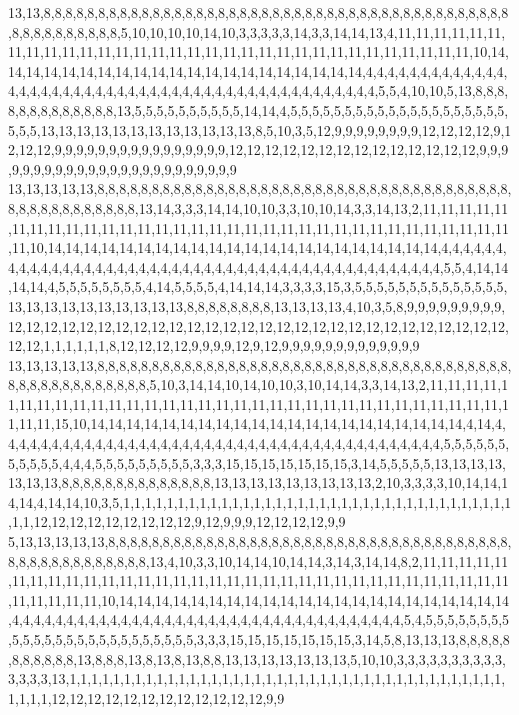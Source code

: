 13,13,8,8,8,8,8,8,8,8,8,8,8,8,8,8,8,8,8,8,8,8,8,8,8,8,8,8,8,8,8,8,8,8,8,8,8,8,8,8,8,8,8,8,8,8,8,8,8,8,8,8,8,8,8,5,10,10,10,10,14,10,3,3,3,3,3,14,3,3,14,14,13,4,11,11,11,11,11,11,11,11,11,11,11,11,11,11,11,11,11,11,11,11,11,11,11,11,11,11,11,11,11,11,11,11,10,14,14,14,14,14,14,14,14,14,14,14,14,14,14,14,14,14,14,14,14,14,4,4,4,4,4,4,4,4,4,4,4,4,4,4,4,4,4,4,4,4,4,4,4,4,4,4,4,4,4,4,4,4,4,4,4,4,4,4,4,4,4,4,4,4,4,4,4,5,5,4,10,10,5,13,8,8,8,8,8,8,8,8,8,8,8,8,8,13,5,5,5,5,5,5,5,5,5,5,14,14,4,5,5,5,5,5,5,5,5,5,5,5,5,5,5,5,5,5,5,5,5,5,5,5,13,13,13,13,13,13,13,13,13,13,13,13,8,5,10,3,5,12,9,9,9,9,9,9,9,9,12,12,12,12,9,12,12,12,9,9,9,9,9,9,9,9,9,9,9,9,9,9,9,9,12,12,12,12,12,12,12,12,12,12,12,12,12,12,9,9,9,9,9,9,9,9,9,9,9,9,9,9,9,9,9,9,9,9,9,9,9,9
13,13,13,13,13,8,8,8,8,8,8,8,8,8,8,8,8,8,8,8,8,8,8,8,8,8,8,8,8,8,8,8,8,8,8,8,8,8,8,8,8,8,8,8,8,8,8,8,8,8,8,8,8,8,8,13,14,3,3,3,14,14,10,10,3,3,10,10,14,3,3,14,13,2,11,11,11,11,11,11,11,11,11,11,11,11,11,11,11,11,11,11,11,11,11,11,11,11,11,11,11,11,11,11,11,11,11,11,10,14,14,14,14,14,14,14,14,14,14,14,14,14,14,14,14,14,14,14,14,14,14,4,4,4,4,4,4,4,4,4,4,4,4,4,4,4,4,4,4,4,4,4,4,4,4,4,4,4,4,4,4,4,4,4,4,4,4,4,4,4,4,4,4,4,4,4,4,5,5,4,14,14,14,14,4,5,5,5,5,5,5,5,5,4,14,5,5,5,5,4,14,14,14,3,3,3,3,15,3,5,5,5,5,5,5,5,5,5,5,5,5,5,5,13,13,13,13,13,13,13,13,13,13,8,8,8,8,8,8,8,8,13,13,13,13,4,10,3,5,8,9,9,9,9,9,9,9,9,9,12,12,12,12,12,12,12,12,12,12,12,12,12,12,12,12,12,12,12,12,12,12,12,12,12,12,12,12,12,12,1,1,1,1,1,1,8,12,12,12,12,9,9,9,9,12,9,12,9,9,9,9,9,9,9,9,9,9,9,9,9
13,13,13,13,13,8,8,8,8,8,8,8,8,8,8,8,8,8,8,8,8,8,8,8,8,8,8,8,8,8,8,8,8,8,8,8,8,8,8,8,8,8,8,8,8,8,8,8,8,8,8,8,8,8,8,8,5,10,3,14,14,10,14,10,10,3,10,14,14,3,3,14,13,2,11,11,11,11,11,11,11,11,11,11,11,11,11,11,11,11,11,11,11,11,11,11,11,11,11,11,11,11,11,11,11,11,11,11,11,15,10,14,14,14,14,14,14,14,14,14,14,14,14,14,14,14,14,14,14,14,14,14,4,14,4,4,4,4,4,4,4,4,4,4,4,4,4,4,4,4,4,4,4,4,4,4,4,4,4,4,4,4,4,4,4,4,4,4,4,4,4,4,4,4,4,5,5,5,5,5,5,5,5,5,5,5,4,4,4,5,5,5,5,5,5,5,5,5,3,3,3,15,15,15,15,15,15,15,3,14,5,5,5,5,5,13,13,13,13,13,13,13,8,8,8,8,8,8,8,8,8,8,8,8,8,8,13,13,13,13,13,13,13,13,13,2,10,3,3,3,3,10,14,14,14,14,4,14,14,10,3,5,1,1,1,1,1,1,1,1,1,1,1,1,1,1,1,1,1,1,1,1,1,1,1,1,1,1,1,1,1,1,1,1,1,1,1,1,1,1,12,12,12,12,12,12,12,12,12,9,12,9,9,9,12,12,12,12,9,9
5,13,13,13,13,13,8,8,8,8,8,8,8,8,8,8,8,8,8,8,8,8,8,8,8,8,8,8,8,8,8,8,8,8,8,8,8,8,8,8,8,8,8,8,8,8,8,8,8,8,8,8,8,8,8,8,13,4,10,3,3,10,14,14,10,14,14,3,14,3,14,14,8,2,11,11,11,11,11,11,11,11,11,11,11,11,11,11,11,11,11,11,11,11,11,11,11,11,11,11,11,11,11,11,11,11,11,11,11,11,11,11,10,14,14,14,14,14,14,14,14,14,14,14,14,14,14,14,14,14,14,14,14,14,14,4,4,4,4,4,4,4,4,4,4,4,4,4,4,4,4,4,4,4,4,4,4,4,4,4,4,4,4,4,4,4,4,4,4,4,4,5,4,5,5,5,5,5,5,5,5,5,5,5,5,5,5,5,5,5,5,5,5,5,5,5,5,5,3,3,3,15,15,15,15,15,15,15,3,14,5,8,13,13,13,8,8,8,8,8,8,8,8,8,8,8,13,8,8,8,13,8,13,8,13,8,8,13,13,13,13,13,13,13,5,10,10,3,3,3,3,3,3,3,3,3,3,3,3,3,3,13,1,1,1,1,1,1,1,1,1,1,1,1,1,1,1,1,1,1,1,1,1,1,1,1,1,1,1,1,1,1,1,1,1,1,1,1,1,1,1,1,1,1,1,1,12,12,12,12,12,12,12,12,12,12,12,12,9,9
